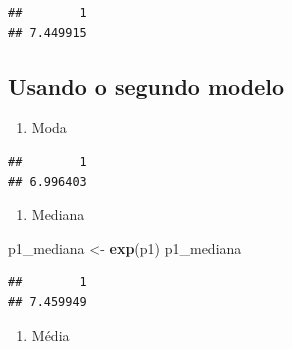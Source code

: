 \documentclass[]{article}
\newenvironment{Shaded}{\begin{snugshade}}{\end{snugshade}}
\newcommand{\KeywordTok}[1]{\textcolor[rgb]{0.13,0.29,0.53}{\textbf{#1}}}
\newcommand{\DataTypeTok}[1]{\textcolor[rgb]{0.13,0.29,0.53}{#1}}
\newcommand{\DecValTok}[1]{\textcolor[rgb]{0.00,0.00,0.81}{#1}}
\newcommand{\StringTok}[1]{\textcolor[rgb]{0.31,0.60,0.02}{#1}}
\newcommand{\OperatorTok}[1]{\textcolor[rgb]{0.81,0.36,0.00}{\textbf{#1}}}
\newcommand{\NormalTok}[1]{#1}
\providecommand{\tightlist}{%
  \setlength{\itemsep}{0pt}\setlength{\parskip}{0pt}}
\begin{document}
\begin{verbatim}
##        1 
## 7.449915
\end{verbatim}

\subsection{Usando o segundo modelo}\label{usando-o-segundo-modelo}

\begin{enumerate}
\def\labelenumi{\alph{enumi}.}
\tightlist
\item
  Moda
\end{enumerate}

\begin{Shaded}
\end{Shaded}

\begin{verbatim}
##        1 
## 6.996403
\end{verbatim}

\begin{enumerate}
\def\labelenumi{\alph{enumi}.}
\setcounter{enumi}{1}
\tightlist
\item
  Mediana
\end{enumerate}

\begin{Shaded}
\begin{Highlighting}[]
\NormalTok{p1_mediana <-}\StringTok{ }\KeywordTok{exp}\NormalTok{(p1)}
\NormalTok{p1_mediana}
\end{Highlighting}
\end{Shaded}

\begin{verbatim}
##        1 
## 7.459949
\end{verbatim}

\begin{enumerate}
\def\labelenumi{\alph{enumi}.}
\setcounter{enumi}{2}
\tightlist
\item
  Média
\end{enumerate}
\end{document}
